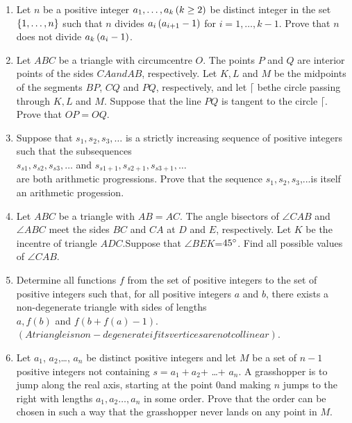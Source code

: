 \documentclass[12pt,-letter paper]{article}                       \usepackage{gvv}
\begin{document}
\begin{enumerate}
	\item Let $n$ be a positive integer $a_1,\dots,a_k\left(k\geq 2\right)$ be distinct integer in the set $\left\{1,\dots, n\right\}$ such that $n$ divides $a_i \left(a_{i+1}-1\right)$ for $i=1,\dots, k-1$. Prove that $n$ does not divide $ a_k \left(a_i-1\right)$.
\item Let $ABC$ be a triangle with circumcentre $O$. The points $P$ and $Q$ are interior points of the sides $CA and AB$, respectively. Let $K,L$ and $M$ be the midpoints of the segments $BP$, $CQ$ and $PQ$, respectively, and let $\lceil$ bethe circle passing through $K,L$ and $M$. Suppose that the line $PQ$ is tangent to the circle $\lceil$. Prove that $OP=OQ$.
\item Suppose that $s_1, s_2, s_3,\dots $ is a strictly increasing sequence of positive integers such that the subsequences \\
	$s_{s1}, s_{s2}, s_{s3},\dots$ and $s_{s1+1}, s_{s2+1}, s_{s3+1},\dots$
	   \\
are both arithmetic progressions. Prove that the sequence $s_1,s_2,s_3$,...is itself an arithmetic progession.
\item Let $ABC$ be a triangle with $AB=AC$. The angle bisectors of $\angle CAB$ and $\angle ABC$ meet the sides $BC$ and $CA$ at $D$ and $E$, respectively. Let $K$ be the incentre of triangle $ADC$.Suppose that $\angle BEK$=$45\degree$. Find all possible values of $\angle CAB$.
\item  Determine all functions $f$ from the set of positive integers to the set of positive integers
such that, for all positive integers $a$ and $b$, there exists a non-degenerate triangle with sides of lengths
		\\$a, f (b)$ and $f (b+f(a)-1).$ \\
		$(A triangle is non-degenerate if its vertices are not collinear)$.
\item Let $a_{1}$, $a_{2}$,\dots, $a_{n}$ be distinct positive integers and let $M$ be a set of $n-1$ positive integers not containing $s = a_{1}+a_{2}$+ \dots + $a_{n}$. A grasshopper is to jump along the real axis, starting at the point 0and making $n$ jumps to the right with lengths $a_1, a_2\dots,a_n$ in some order. Prove that the order can be chosen in such a way that the grasshopper never lands on any point in $M$.
\end{enumerate}
\end{document}
